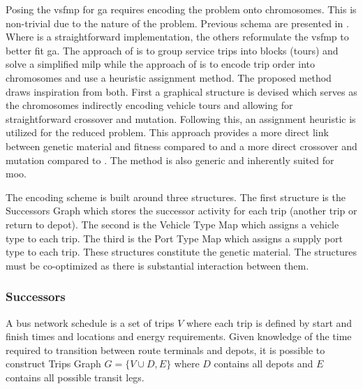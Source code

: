 Posing the \gls{vsfmp} for \gls{ga} requires encoding the problem onto chromosomes. This is non-trivial due to the nature of the problem. Previous schema are presented in \cite{Rogge_2018_AE, Li_2020_JAT, Yao_2020_SCS}. Where \cite{Li_2020_JAT} is a straightforward implementation, the others reformulate the \gls{vsfmp} to better fit \gls{ga}. The approach of \cite{Rogge_2018_AE} is to group service trips into blocks (tours) and solve a simplified \gls{milp} while the approach of \cite{Yao_2020_SCS} is to encode trip order into chromosomes and use a heuristic assignment method. The proposed method draws inspiration from both. First a graphical structure is devised which serves as the chromosomes indirectly encoding vehicle tours and allowing for straightforward crossover and mutation. Following this, an assignment heuristic is utilized for the reduced problem. This approach provides a more direct link between genetic material and fitness compared to \cite{Yao_2020_SCS} and a more direct crossover and mutation compared to \cite{Rogge_2018_AE}. The method is also generic and inherently suited for \gls{moo}.

The encoding scheme is built around three structures. The first structure is the Successors Graph which stores the successor activity for each trip (another trip or return to depot). The second is the Vehicle Type Map which assigns a vehicle type to each trip. The third is the Port Type Map which assigns a supply port type to each trip. These structures constitute the genetic material. The structures must be co-optimized as there is substantial interaction between them.

\subsubsection{Successors}

A bus network schedule is a set of trips $V$ where each trip is defined by start and finish times and locations and energy requirements. Given knowledge of the time required to transition between route terminals and depots, it is possible to construct Trips Graph $G = \{V \cup D, E\}$ where $D$ contains all depots and $E$ contains all possible transit legs.

